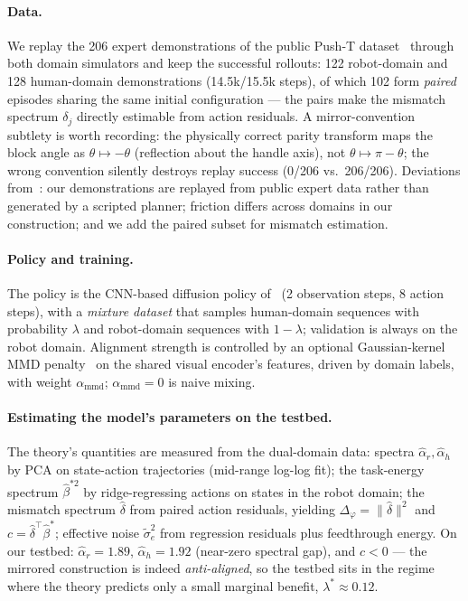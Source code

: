 \paragraph{Data.}
We replay the 206 expert demonstrations of the public Push-T dataset~\cite{chi2023diffusion,florence2022implicit} through both domain simulators and keep the successful rollouts: 122 robot-domain and 128 human-domain demonstrations (14.5k/15.5k steps), of which 102 form \emph{paired} episodes sharing the same initial configuration --- the pairs make the mismatch spectrum $\delta_j$ directly estimable from action residuals.
A mirror-convention subtlety is worth recording: the physically correct parity transform maps the block angle as $\theta \mapsto -\theta$ (reflection about the handle axis), not $\theta \mapsto \pi - \theta$; the wrong convention silently destroys replay success (0/206 vs.\ 206/206).
Deviations from~\cite{egobridge2025}: our demonstrations are replayed from public expert data rather than generated by a scripted planner; friction differs across domains in our construction; and we add the paired subset for mismatch estimation.

\paragraph{Policy and training.}
The policy is the CNN-based diffusion policy of~\cite{chi2023diffusion} (2 observation steps, 8 action steps), with a \emph{mixture dataset} that samples human-domain sequences with probability $\lambda$ and robot-domain sequences with $1-\lambda$; validation is always on the robot domain.
Alignment strength is controlled by an optional Gaussian-kernel MMD penalty~\cite{gretton2012kernel} on the shared visual encoder's features, driven by domain labels, with weight $\alpha_{\mathrm{mmd}}$; $\alpha_{\mathrm{mmd}} = 0$ is naive mixing.

\paragraph{Estimating the model's parameters on the testbed.}
The theory's quantities are measured from the dual-domain data: spectra $\hat\alpha_r, \hat\alpha_h$ by PCA on state-action trajectories (mid-range log-log fit); the task-energy spectrum $\hat\beta^{*2}$ by ridge-regressing actions on states in the robot domain; the mismatch spectrum $\hat\delta$ from paired action residuals, yielding $\Delta_\varphi = \|\hat\delta\|^2$ and $c = \hat\delta^\top\hat\beta^*$; effective noise $\tilde\sigma_e^2$ from regression residuals plus feedthrough energy.
On our testbed: $\hat\alpha_r = 1.89$, $\hat\alpha_h = 1.92$ (near-zero spectral gap), and $c < 0$ --- the mirrored construction is indeed \emph{anti-aligned}, so the testbed sits in the regime where the theory predicts only a small marginal benefit, $\lambda^* \approx 0.12$.

